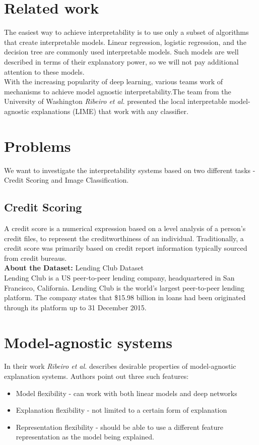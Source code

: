 \section{Related work}
The easiest way to achieve interpretability is to use only a subset of algorithms that create interpretable models. Linear regression, logistic regression, and the decision tree are commonly used interpretable models.\cite{molnar2019}
Such models are well described in terms of their explanatory power, so we will not pay additional attention to these models. \\
With the increasing popularity of deep learning, various teams work of mechanisms to achieve model agnostic interpretability\cite{ribeiro2016model}.The team from the University of Washington \textit{Ribeiro et al.}\cite{RibeiroSG16}  presented the local interpretable model-agnostic explanations (LIME) that work with any classifier. 

\section{Problems}
We want to investigate the interpretability systems based on two different tasks - Credit Scoring and Image Classification. 

\subsection{Credit Scoring}
A credit score is a numerical expression based on a level analysis of a person's credit files, to represent the creditworthiness of an individual. Traditionally, a credit score was primarily based on credit report information typically sourced from credit bureaus. \\
\textbf{About the Dataset:} Lending Club Dataset \\
Lending Club is a US peer-to-peer lending company, headquartered in San Francisco, California. Lending Club is the world's largest peer-to-peer lending platform. The company states that \$15.98 billion in loans had been originated through its platform up to 31 December 2015.


\section{Model-agnostic systems}
In their work \textit{Ribeiro et al.}\cite{ribeiro2016model} describes desirable properties of model-agnostic explanation systems. Authors point out three such features:
\begin{itemize}
    \item Model flexibility -  can work with both linear models and deep networks
    \item Explanation flexibility - not limited to a certain form of explanation
    \item Representation flexibility - should be able to use a different feature representation as the model being explained. 
\end{itemize}

